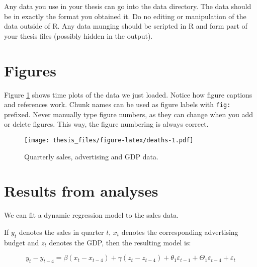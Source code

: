 \documentclass{monashthesis}
\begin{document}
\begin{Shaded}
\begin{Highlighting}[]
\StringTok{ }\NormalTok{(}\NormalTok{(}\NormalTok{)[,}\OperatorTok{-}\NormalTok{], }\NormalTok{, }\NormalTok{)}
\end{Highlighting}
\end{Shaded}

Any data you use in your thesis can go into the data directory. The data
should be in exactly the format you obtained it. Do no editing or
manipulation of the data outside of R. Any data munging should be
scripted in R and form part of your thesis files (possibly hidden in the
output).

\section{Figures}\label{figures}

Figure \ref{fig:deaths} shows time plots of the data we just loaded.
Notice how figure captions and references work. Chunk names can be used
as figure labels with \texttt{fig:} prefixed. Never manually type figure
numbers, as they can change when you add or delete figures. This way,
the figure numbering is always correct.

\begin{figure}
\centering
\texttt{[image: thesis\_files/figure-latex/deaths-1.pdf]}
\caption{\label{fig:deaths}Quarterly sales, advertising and GDP data.}
\end{figure}

\section{Results from analyses}\label{results-from-analyses}

We can fit a dynamic regression model to the sales data.

If \(y_t\) denotes the sales in quarter \(t\), \(x_t\) denotes the
corresponding advertising budget and \(z_t\) denotes the GDP, then the
resulting model is:

\begin{equation}
  y_t - y_{t-4} = \beta (x_t-x_{t-4}) + \gamma (z_t-z_{t-4}) + \theta_1 \varepsilon_{t-1} + \Theta_1 \varepsilon_{t-4} + \varepsilon_t
\end{equation}
\end{document}
